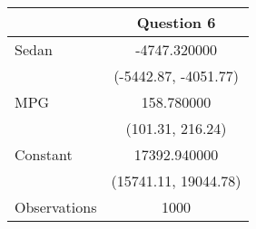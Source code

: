 \begin{tabular}{lc}
\toprule
 & Question 6 \\
\midrule
Sedan & -4747.320000 \\
  & (-5442.87, -4051.77) \\
MPG & 158.780000 \\
 & (101.31, 216.24) \\
Constant & 17392.940000 \\
 & (15741.11, 19044.78) \\
Observations & 1000 \\
\bottomrule
\end{tabular}
